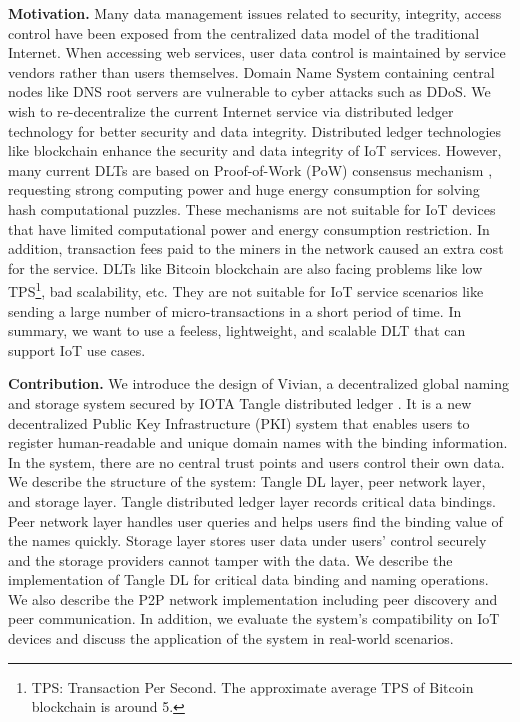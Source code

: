 \begin{onehalfspace}
\end{onehalfspace}
\noindent\textbf{Motivation.} Many data management issues related to security, integrity, access control have been exposed from the centralized data model of the traditional Internet.
When accessing web services, user data control is maintained by service vendors rather than users themselves.
Domain Name System containing central nodes like DNS root servers are vulnerable to cyber attacks such as DDoS.
We wish to re-decentralize the current Internet service via distributed ledger technology for better security and data integrity.
Distributed ledger technologies like blockchain enhance the security and data integrity of IoT services.
However, many current DLTs are based on Proof-of-Work (PoW) consensus mechanism \cite{10.1145/2976749.2978341}, requesting strong computing power and huge energy consumption for solving hash computational puzzles.
These mechanisms are not suitable for IoT devices that have limited computational power and energy consumption restriction. In addition, transaction fees paid to the miners in the network caused an extra cost for the service.
DLTs like Bitcoin blockchain are also facing problems like low TPS\footnote{TPS: Transaction Per Second. The approximate average TPS of Bitcoin blockchain is around 5.}, bad scalability, etc.
They are not suitable for IoT service scenarios like sending a large number of micro-transactions in a short period of time. 
In summary, we want to use a feeless, lightweight, and scalable DLT that can support IoT use cases.


\begin{onehalfspace}
\end{onehalfspace}
\noindent\textbf{Contribution.} We introduce the design of Vivian, a decentralized global naming and storage system secured by IOTA Tangle distributed ledger \cite{popov2015tangle}.
It is a new decentralized Public Key Infrastructure (PKI) system that enables users to register human-readable and unique domain names with the binding information.
In the system, there are no central trust points and users control their own data.
We describe the structure of the system: Tangle DL layer, peer network layer, and storage layer.
Tangle distributed ledger layer records critical data bindings. Peer network layer handles user queries and helps users find the binding value of the names quickly.
Storage layer stores user data under users' control securely and the storage providers cannot tamper with the data.
We describe the implementation of Tangle DL for critical data binding and naming operations.
We also describe the P2P network implementation including peer discovery and peer communication.
In addition, we evaluate the system's compatibility on IoT devices and discuss the application of the system in real-world scenarios.